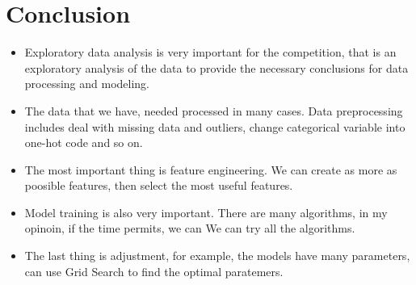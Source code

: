 \section{Conclusion}

\begin{itemize}
	\item Exploratory data analysis is 
	very important for the competition,
	that is an exploratory analysis 
	of the data to 
	provide the necessary conclusions 
	for data processing and modeling. 
	\item The data that we have,
	needed processed in many cases.
	Data preprocessing includes 
	deal with missing data and outliers,
	change categorical variable 
	into one-hot code and so on.
	\item The most important thing is
	feature engineering.
	We can create as more as poosible features,
	then select the most useful features.
	\item Model training is also very important.
	There are many algorithms, 
	in my opinoin, 
	if the time permits,
	we can We can try all the algorithms. 
	\item The last thing is adjustment,
	for example,
	the models have many parameters,
	can use Grid Search to find 
	the optimal paratemers.	
\end{itemize}











